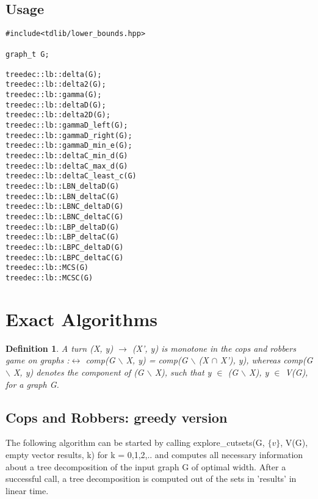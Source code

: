 \documentclass[a4wide]{article}
\newtheorem*{definition}{Definition}
\begin{document}
\subsection{Usage}

\begin{lstlisting}[mathescape]
#include<tdlib/lower_bounds.hpp>

graph_t G;

treedec::lb::delta(G);
treedec::lb::delta2(G);
treedec::lb::gamma(G);
treedec::lb::deltaD(G);
treedec::lb::delta2D(G);
treedec::lb::gammaD_left(G);
treedec::lb::gammaD_right(G);
treedec::lb::gammaD_min_e(G);
treedec::lb::deltaC_min_d(G)
treedec::lb::deltaC_max_d(G)
treedec::lb::deltaC_least_c(G)
treedec::lb::LBN_deltaD(G)
treedec::lb::LBN_deltaC(G)
treedec::lb::LBNC_deltaD(G)
treedec::lb::LBNC_deltaC(G)
treedec::lb::LBP_deltaD(G)
treedec::lb::LBP_deltaC(G)
treedec::lb::LBPC_deltaD(G)
treedec::lb::LBPC_deltaC(G)
treedec::lb::MCS(G)
treedec::lb::MCSC(G)
\end{lstlisting}

\newpage

\section{Exact Algorithms}

\begin{definition}
A turn (X, y) $\rightarrow$ (X', y) is monotone in the cops and robbers game on graphs :$\leftrightarrow$ comp(G $\backslash$ X, y) = comp(G $\backslash$ (X $\cap$ X'), y), whereas comp(G $\backslash$ X, y) denotes the component of (G $\backslash$ X), such that y $\in$ (G $\backslash$ X), y $\in$ V(G), for a graph G.
\end{definition}

\subsection{Cops and Robbers: greedy version}

The following algorithm can be started by calling explore\_cutsets(G, $\{v\}$, V(G), empty vector results, k) for k = 0,1,2,.. and computes all necessary information about a tree decomposition of the input graph G of optimal width. After a successful call, a tree decomposition is computed out of the sets in 'results' in linear time. 
\end{document}
